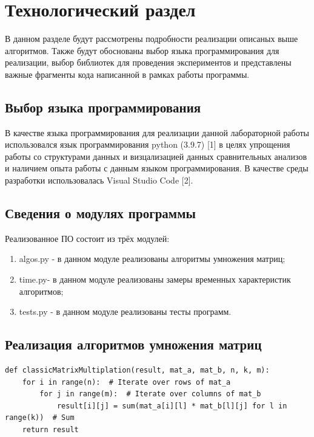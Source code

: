 \chapter{Технологический раздел}

В данном разделе будут рассмотрены подробности реализации описаных выше алгоритмов. Также будут обоснованы выбор языка программирования для реализации, выбор библиотек для проведения экспериментов и представлены важные фрагменты кода написанной в рамках работы программы.

\section{Выбор языка программирования}

В качестве языка программирования для реализации данной лабораторной работы использовался язык программирования python (3.9.7) [1] в целях упрощения работы со структурами данных и визцализацией данных сравнительных анализов и наличием опыта работы с данным языком программирования. В качестве среды разработки использовалась Visual Studio Code [2]. 

\section{Сведения о модулях программы}

Реализованное ПО состоит из трёх модулей:
\begin{enumerate}
	\item algos.py - в данном модуле реализованы алгоритмы умножения матриц;
	\item time.py- в данном модуле реализованы замеры временных характеристик алгоритмов;
	\item tests.py - в данном модуле реализованы тесты программ.
\end{enumerate}

\section{Реализация алгоритмов умножения матриц}

\begin{lstlisting}[label=some-code-1,caption=Реализация классического умножения матриц]
def classicMatrixMultiplation(result, mat_a, mat_b, n, k, m):
    for i in range(n):  # Iterate over rows of mat_a
        for j in range(m):  # Iterate over columns of mat_b
            result[i][j] = sum(mat_a[i][l] * mat_b[l][j] for l in range(k))  # Sum
    return result

\end{lstlisting}

